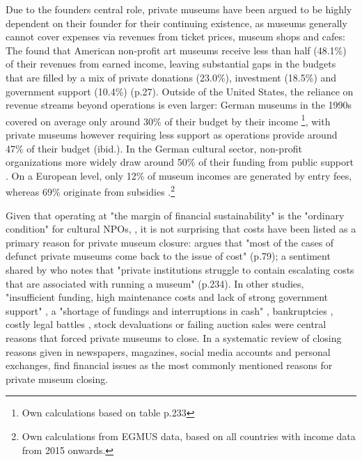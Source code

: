 \documentclass[12pt]{article}
\begin{document}
Due to the founders central role, private museums have been argued to be highly dependent on their founder for their continuing existence, as museums generally cannot cover expenses via revenues from ticket prices, museum shops and cafes:
The \textcite{IMLS_2008_funding} found that American non-profit art museums receive less than half (48.1\%) of their revenues from earned income, leaving substantial gaps in the budgets that are filled by a mix of private donations (23.0\%), investment (18.5\%) and government support (10.4\%) (p.27).
Outside of the United States, the reliance on revenue streams beyond operations is even larger:
German museums in the 1990s covered on average only around 30\% of their budget by their income \parencite{Martin_1993_museen}\footnote{Own calculations based on table p.233}, with private museums however requiring less support as operations provide around 47\% of their budget (ibid.).
In the German cultural sector, non-profit organizations more widely  draw around 50\% of their funding from public support \parencite[p.82]{Zimmer_Priller_2007_gemeinnuetzig}.
On a European level, only 12\% of museum incomes are generated by entry fees, whereas 69\% originate from subsidies \parencite{EGMUS_2024_complete}.\footnote{Own calculations from EGMUS data, based on all countries with income data from 2015 onwards.}


Given that operating at "the margin of financial sustainability" is the "ordinary condition" for cultural NPOs, \parencite[p.2]{Licci_BaraldiBonini_2024_sustainability}, it is not surprising that costs have been listed as a primary reason for private museum closure:
\textcite{Adam_2021_rise} argues that "most of the cases of defunct private museums come back to the issue of cost" (p.79); a sentiment shared by \textcite{Walker_2019_collector} who notes that "private institutions struggle to contain escalating costs that are associated with running a museum" (p.234).
In other studies, "insufficient funding, high maintenance costs and lack of strong government support" \parencite[p.7]{Zennaro_2017_shanghai}, a "shortage of fundings and interruptions in cash" \parencite[p.45]{Song_2008_private}, bankruptcies \parencite{Velthuis_Gera_2024_fragility,Liu_2019_identities,DeNigris_2018_museums}, costly legal battles \parencite{Velthuis_Gera_2024_fragility}, stock devaluations \parencite{Walker_2019_collector} or failing auction sales \parencite{Bechtler_Imhof_2018_future} were central reasons that forced private museums to close.
In a systematic review of closing reasons given in newspapers, magazines, social media accounts and personal exchanges, \textcite{Velthuis_Gera_2024_fragility} find financial issues as the most commonly mentioned reasons for private museum closing.
\end{document}
